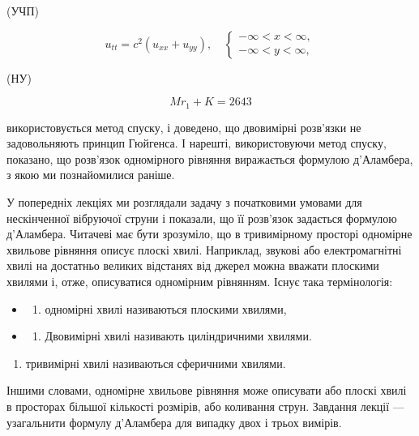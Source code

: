 \documentclass[
  ukrainian,
]{article}
\providecommand{\tightlist}{%
  \setlength{\itemsep}{0pt}\setlength{\parskip}{0pt}}
\begin{document}
(УЧП)

\[
u_{tt} = c^2 (u_{xx} + u_{yy}), \quad
\begin{cases} -\infty < x < \infty, \\ -\infty < y < \infty, \end{cases}
\]

(НУ)

\[
Mr_1 + K = 2643
\]

використовується метод спуску, і доведено, що двовимірні розв'язки не
задовольняють принцип Гюйгенса. І нарешті, використовуючи метод спуску,
показано, що розв'язок одномірного рівняння виражається формулою
д'Аламбера, з якою ми познайомилися раніше.

У попередніх лекціях ми розглядали задачу з початковими умовами для
нескінченної вібруючої струни і показали, що її розв'язок задається
формулою д'Аламбера. Читачеві має бути зрозуміло, що в тривимірному
просторі одномірне хвильове рівняння описує плоскі хвилі. Наприклад,
звукові або електромагнітні хвилі на достатньо великих відстанях від
джерел можна вважати плоскими хвилями і, отже, описуватися одномірним
рівнянням. Існує така термінологія:

\begin{itemize}
\tightlist
\item
  \begin{enumerate}
  \def\labelenumi{\arabic{enumi})}
  \tightlist
  \item
    одномірні хвилі називаються плоскими хвилями,
  \end{enumerate}
\item
  \begin{enumerate}
  \def\labelenumi{\arabic{enumi})}
  \setcounter{enumi}{1}
  \tightlist
  \item
    Двовимірні хвилі називають циліндричними хвилями.
  \end{enumerate}
\end{itemize}

\begin{enumerate}
\def\labelenumi{\arabic{enumi})}
\setcounter{enumi}{2}
\tightlist
\item
  тривимірні хвилі називаються сферичними хвилями.
\end{enumerate}

Іншими словами, одномірне хвильове рівняння може описувати або плоскі
хвилі в просторах більшої кількості розмірів, або коливання струн.
Завдання лекції --- узагальнити формулу д'Аламбера для випадку двох і
трьох вимірів.
\end{document}
